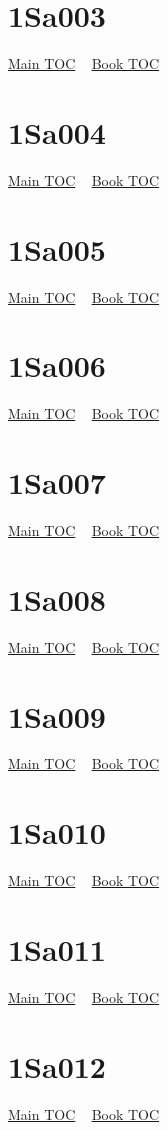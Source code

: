 \documentclass{book}
\begin{document}
  \section{1Sa003}\hyperlink{toc}{Main TOC} ~ \hyperref[subsec:1Sa]{Book TOC} 
  \section{1Sa004}\hyperlink{toc}{Main TOC} ~ \hyperref[subsec:1Sa]{Book TOC} 
  \section{1Sa005}\hyperlink{toc}{Main TOC} ~ \hyperref[subsec:1Sa]{Book TOC} 
  \section{1Sa006}\hyperlink{toc}{Main TOC} ~ \hyperref[subsec:1Sa]{Book TOC} 
  \section{1Sa007}\hyperlink{toc}{Main TOC} ~ \hyperref[subsec:1Sa]{Book TOC} 
  \section{1Sa008}\hyperlink{toc}{Main TOC} ~ \hyperref[subsec:1Sa]{Book TOC} 
  \section{1Sa009}\hyperlink{toc}{Main TOC} ~ \hyperref[subsec:1Sa]{Book TOC} 
  \section{1Sa010}\hyperlink{toc}{Main TOC} ~ \hyperref[subsec:1Sa]{Book TOC} 
  \section{1Sa011}\hyperlink{toc}{Main TOC} ~ \hyperref[subsec:1Sa]{Book TOC} 
  \section{1Sa012}\hyperlink{toc}{Main TOC} ~ \hyperref[subsec:1Sa]{Book TOC} 
\end{document}
